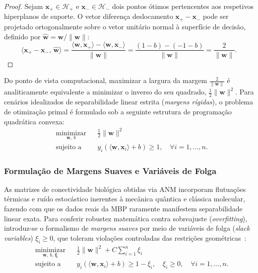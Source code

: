 \documentclass[12pt, a4paper]{article}
\begin{document}
\begin{proof}
Sejam $\mathbf{x}_+ \in \mathcal{H}_+$ e $\mathbf{x}_- \in \mathcal{H}_-$ dois pontos ótimos pertencentes aos respetivos hiperplanos de suporte. O vetor diferença deslocamento $\mathbf{x}_+ - \mathbf{x}_-$ pode ser projetado ortogonalmente sobre o vetor unitário normal à superfície de decisão, definido por $\hat{\mathbf{w}} = \mathbf{w}/\|\mathbf{w}\|$:
\[
\langle \mathbf{x}_+ - \mathbf{x}_-, \, \hat{\mathbf{w}}\rangle = \frac{\langle\mathbf{w},\mathbf{x}_+\rangle - \langle\mathbf{w},\mathbf{x}_-\rangle}{\|\mathbf{w}\|} = \frac{(1-b)-(-1-b)}{\|\mathbf{w}\|} = \frac{2}{\|\mathbf{w}\|}.
\]
\end{proof}

Do ponto de vista computacional, maximizar a largura da margem $\frac{2}{\|\mathbf{w}\|}$ é analiticamente equivalente a minimizar o inverso do seu quadrado, $\frac{1}{2}\|\mathbf{w}\|^2$. Para cenários idealizados de separabilidade linear estrita (\emph{margens rígidas}), o problema de otimização primal é formulado sob a seguinte estrutura de programação quadrática convexa:
\begin{equation}\label{eq:primal_rigido}
\begin{aligned}
    &\underset{\mathbf{w}, \, b}{\text{minimizar}}    && \frac{1}{2}\|\mathbf{w}\|^2 \\
    &\text{sujeito a}    && y_i\left(\langle\mathbf{w},\mathbf{x}_i\rangle + b\right) \geq 1, \quad \forall i = 1,\ldots,n.
\end{aligned}
\end{equation}

\subsubsection{Formulação de Margens Suaves e Variáveis de Folga}

As matrizes de conectividade biológica obtidas via ANM incorporam flutuações térmicas e ruído estocástico inerentes à mecânica quântica e clássica molecular, fazendo com que os dados reais da MBP raramente manifestem separabilidade linear exata. Para conferir robustez matemática contra sobreajuste (\textit{overfitting}), introduz-se o formalismo de \emph{margens suaves} por meio de variáveis de folga (\textit{slack variables}) $\xi_i \geq 0$, que toleram violações controladas das restrições geométricas~\cite{Cortes1995, lorena2007}:
\begin{equation}\label{eq:primal_suave}
\begin{aligned}
    &\underset{\mathbf{w},\, b,\, \boldsymbol{\xi}}{\text{minimizar}}    && \frac{1}{2}\|\mathbf{w}\|^2 + C\sum_{i=1}^n \xi_i \\
    &\text{sujeito a}    && y_i\left(\langle\mathbf{w},\mathbf{x}_i\rangle + b\right) \geq 1 - \xi_i, \quad \xi_i \geq 0, \quad \forall i = 1,\ldots,n.
\end{aligned}
\end{equation}
\end{document}
